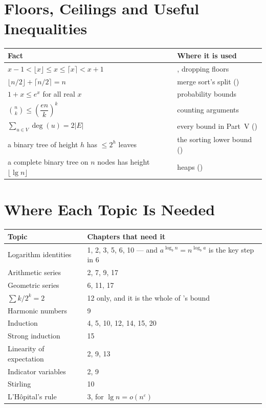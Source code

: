 \section{Floors, Ceilings and Useful Inequalities}

\begin{conceptbox}
\begin{longtable}{@{}L{6.0cm}L{8.5cm}@{}}
\toprule
{}
\textbf{Fact} & \textbf{Where it is used} \\
\midrule
\endhead
$x - 1 < \lfloor x \rfloor \le x \le \lceil x \rceil < x+1$ &
  , dropping floors \\
$\lfloor n/2 \rfloor + \lceil n/2 \rceil = n$ &
  merge sort's split () \\
$1 + x \le e^{x}$ for all real $x$ &
  probability bounds \\
$\binom{n}{k} \le \left(\dfrac{en}{k}\right)^{k}$ &
  counting arguments \\
$\sum_{u \in V} \deg(u) = 2|E|$ &
  every bound in Part~V () \\
a binary tree of height $h$ has $\le 2^{h}$ leaves &
  the sorting lower bound () \\
a complete binary tree on $n$ nodes has height $\lfloor \lg n \rfloor$ &
  heaps () \\
\bottomrule
\end{longtable}
\end{conceptbox}

\section{Where Each Topic Is Needed}

\begin{longtable}{@{}L{4.6cm}L{9.9cm}@{}}
\toprule
{}
\textbf{Topic} & \textbf{Chapters that need it} \\
\midrule
\endhead
Logarithm identities & 1, 2, 3, 5, 6, 10 --- and $a^{\log_b n} = n^{\log_b a}$
  is the key step in 6 \\
Arithmetic series & 2, 7, 9, 17 \\
Geometric series & 6, 11, 17 \\
$\sum k/2^{k} = 2$ & 12 only, and it is the whole of
  's bound \\
Harmonic numbers & 9 \\
Induction & 4, 5, 10, 12, 14, 15, 20 \\
Strong induction & 15 \\
Linearity of expectation & 2, 9, 13 \\
Indicator variables & 2, 9 \\
Stirling & 10 \\
L'H\^opital's rule & 3, for $\lg n = o(n^{\varepsilon})$ \\
\bottomrule
\end{longtable}

